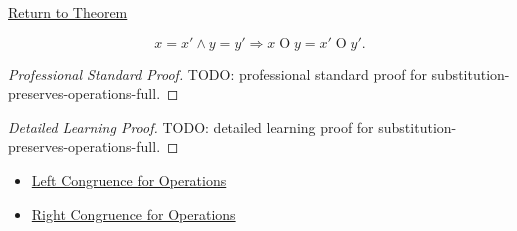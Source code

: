 \newpage
{}
\label{prf:substitution-preserves-operations-full}

\begin{remark*}[Return]
\hyperref[prop:substitution-preserves-operations-full]{Return to Theorem}
\end{remark*}

\begin{proposition*}
\[
x=x' \land y=y' \Longrightarrow x\mathbin{O}y=x'\mathbin{O}y'.
\]
\end{proposition*}

\begin{proof}[Professional Standard Proof]
\LRAProofBodyStart
TODO: professional standard proof for substitution-preserves-operations-full.
\end{proof}

\begin{proof}[Detailed Learning Proof]
\LRAProofBodyStart
TODO: detailed learning proof for substitution-preserves-operations-full.
\end{proof}

\begin{remark*}
\end{remark*}

\begin{dependencies}
\begin{itemize}
  \item \hyperref[prop:substitution-preserves-operations-left]{Left Congruence for Operations}
  \item \hyperref[prop:substitution-preserves-operations-right]{Right Congruence for Operations}
\end{itemize}
\end{dependencies}

\clearpage

